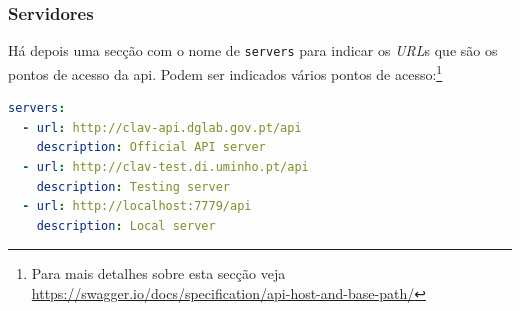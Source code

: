 \vspace{-0.7cm}

\subsubsection{Servidores}
Há depois uma secção com o nome de \texttt{servers} para indicar os \textit{URL}s que são os pontos de acesso 
da \acrshort{api}. Podem ser indicados vários pontos de 
acesso:\footnote{Para mais detalhes sobre esta secção veja \url{https://swagger.io/docs/specification/api-host-and-base-path/}}
\begin{lstlisting}[language=yaml, caption=Exemplo de secção \texttt{servers} indicando os \textit{URL}s e a descrição de cada na especificação \textit{OpenAPI}]
servers:
  - url: http://clav-api.dglab.gov.pt/api
    description: Official API server
  - url: http://clav-test.di.uminho.pt/api
    description: Testing server
  - url: http://localhost:7779/api
    description: Local server
\end{lstlisting}

\vspace{-0.7cm}

